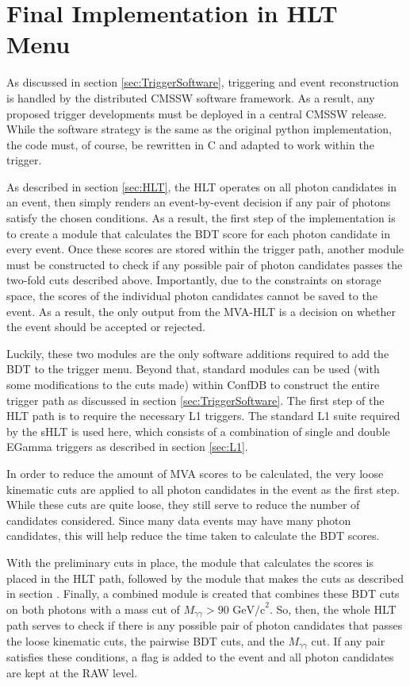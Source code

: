 \documentclass[12pt]{ucsddissertation}
\begin{document}
\section{Final Implementation in HLT Menu} \label{sec:HLTImplementation}
As discussed in section \ref{sec:TriggerSoftware}, triggering and event reconstruction is handled by the distributed CMSSW software framework. As a result, any proposed trigger developments must be deployed in a central CMSSW release. While the software strategy is the same as the original python implementation, the code must, of course, be rewritten in C and adapted to work within the trigger.

As described in section \ref{sec:HLT}, the HLT operates on all photon candidates in an event, then simply renders an event-by-event decision if any pair of photons satisfy the chosen conditions. As a result, the first step of the implementation is to create a module that calculates the BDT score for each photon candidate in every event. Once these scores are stored within the trigger path, another module must be constructed to check if any possible pair of photon candidates passes the two-fold cuts described above. Importantly, due to the constraints on storage space, the scores of the individual photon candidates cannot be saved to the event. As a result, the only output from the MVA-HLT is a decision on whether the event should be accepted or rejected.

Luckily, these two modules are the only software additions required to add the BDT to the trigger menu. Beyond that, standard modules can be used (with some modifications to the cuts made) within ConfDB to construct the entire trigger path as discussed in section \ref{sec:TriggerSoftware}. The first step of the HLT path is to require the necessary L1 triggers. The standard L1 suite required by the sHLT is used here, which consists of a combination of single and double EGamma triggers as described in section \ref{sec:L1}. 

In order to reduce the amount of MVA scores to be calculated, the very loose kinematic cuts are applied to all photon candidates in the event as the first step. While these cuts are quite loose, they still serve to reduce the number of candidates considered. Since many data events may have many photon candidates, this will help reduce the time taken to calculate the BDT scores.

With the preliminary cuts in place, the module that calculates the scores is placed in the HLT path, followed by the module that makes the cuts as described in section \label{cutChoices}. Finally, a combined module is created that combines these BDT cuts on both photons with a mass cut of $M_{\gamma \gamma} > 90$ $\mathrm{GeV/c}^{2}$. So, then, the whole HLT path serves to check if there is any possible pair of photon candidates that passes the loose kinematic cuts, the pairwise BDT cuts, and the $M_{\gamma \gamma}$ cut. If any pair satisfies these conditions, a flag is added to the event and all photon candidates are kept at the RAW level. 
\end{document}
